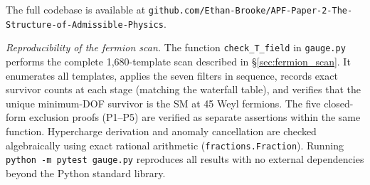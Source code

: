 \documentclass[11pt,a4paper]{article}
\theoremstyle{definition}
\begin{document}
\smallskip\noindent The full codebase is available at
\texttt{github.com/Ethan-Brooke/APF-Paper-2-The-Structure-of-Admissible-Physics}.

\smallskip\noindent\textit{Reproducibility of the fermion scan.}\quad
The function \texttt{check\_T\_field} in \texttt{gauge.py} performs the
complete 1{,}680-template scan described in \S\ref{sec:fermion_scan}.
It enumerates all templates, applies the seven filters in sequence,
records exact survivor counts at each stage (matching the waterfall table),
and verifies that the unique minimum-DOF survivor is the SM at 45 Weyl
fermions.  The five closed-form exclusion proofs (P1--P5) are verified
as separate assertions within the same function.  Hypercharge derivation
and anomaly cancellation are checked algebraically using exact rational
arithmetic (\texttt{fractions.Fraction}).  Running
\texttt{python -m pytest gauge.py} reproduces all results with no
external dependencies beyond the Python standard library.
\end{document}
